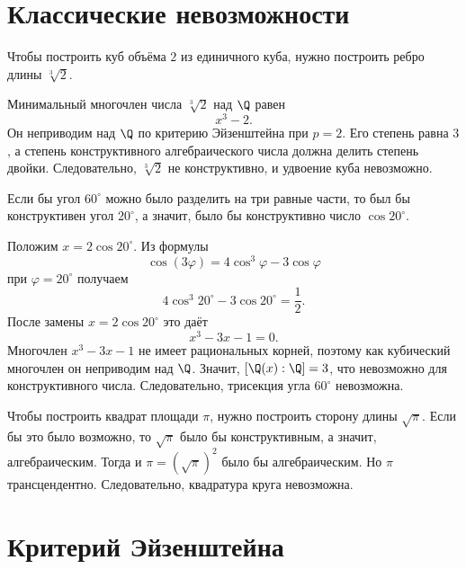 \section{Классические невозможности}

\begin{example}
    Чтобы построить куб объёма $2$ из единичного куба, нужно построить ребро длины $\sqrt[3]{2}$.

    Минимальный многочлен числа $\sqrt[3]{2}$ над $\Q$ равен
    \[
        x^3 - 2.
    \]
    Он неприводим над $\Q$ по критерию Эйзенштейна при $p=2$. Его степень равна $3$, а степень конструктивного алгебраического числа должна делить
    степень двойки.
    Следовательно, $\sqrt[3]{2}$ не конструктивно, и удвоение куба невозможно.
\end{example}

\begin{example}
    Если бы угол $60^\circ$ можно было разделить на три равные части, то был бы конструктивен угол $20^\circ$,
    а значит, было бы конструктивно число $\cos 20^\circ$.

    Положим $x=2\cos20^\circ$. Из формулы
    \[
        \cos(3\varphi)=4\cos^3\varphi-3\cos\varphi
    \]
    при $\varphi=20^\circ$ получаем
    \[
        4\cos^3 20^\circ - 3\cos20^\circ = \frac12.
    \]
    После замены $x=2\cos20^\circ$ это даёт
    \[
        x^3-3x-1=0.
    \]
    Многочлен $x^3-3x-1$ не имеет рациональных корней, поэтому как кубический многочлен он неприводим над
    $\Q$. Значит, $[\Q(x):\Q]=3$, что невозможно для конструктивного числа. Следовательно, трисекция угла
    $60^\circ$ невозможна.

\end{example}

\begin{example}
    Чтобы построить квадрат площади $\pi$, нужно построить сторону длины $\sqrt\pi$. Если бы это было возможно,
    то $\sqrt\pi$ было бы конструктивным, а значит, алгебраическим. Тогда и $\pi=(\sqrt\pi)^2$ было бы алгебраическим.
    Но $\pi$ трансцендентно. Следовательно, квадратура круга невозможна.
\end{example}

\section{Критерий Эйзенштейна}

